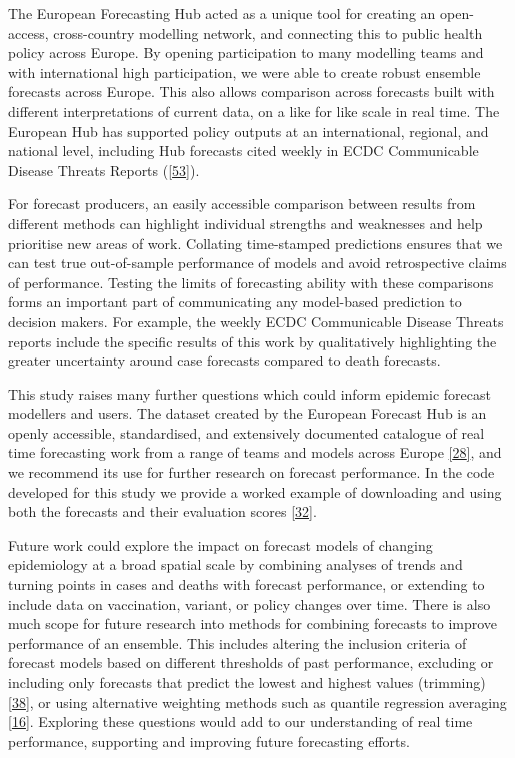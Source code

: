 \documentclass[
]{article}
\begin{document}
The European Forecasting Hub acted as a unique tool for creating an open-access, cross-country modelling network, and connecting this to public health policy across Europe. By opening participation to many modelling teams and with international high participation, we were able to create robust ensemble forecasts across Europe. This also allows comparison across forecasts built with different interpretations of current data, on a like for like scale in real time. The European Hub has supported policy outputs at an international, regional, and national level, including Hub forecasts cited weekly in ECDC Communicable Disease Threats Reports (\protect\hyperlink{ref-europeancentrefordiseasepreventionandcontrolWeeklyThreatsReports}{{[}53{]}}).

For forecast producers, an easily accessible comparison between results from different methods can highlight individual strengths and weaknesses and help prioritise new areas of work. Collating time-stamped predictions ensures that we can test true out-of-sample performance of models and avoid retrospective claims of performance. Testing the limits of forecasting ability with these comparisons forms an important part of communicating any model-based prediction to decision makers. For example, the weekly ECDC Communicable Disease Threats reports include the specific results of this work by qualitatively highlighting the greater uncertainty around case forecasts compared to death forecasts.

This study raises many further questions which could inform epidemic forecast modellers and users. The dataset created by the European Forecast Hub is an openly accessible, standardised, and extensively documented catalogue of real time forecasting work from a range of teams and models across Europe \protect\hyperlink{ref-europeancovid-19forecasthubEuropeanCovid19Forecast}{{[}28{]}}, and we recommend its use for further research on forecast performance. In the code developed for this study we provide a worked example of downloading and using both the forecasts and their evaluation scores \protect\hyperlink{ref-PredictivePerformanceMultimodel2022}{{[}32{]}}.

Future work could explore the impact on forecast models of changing epidemiology at a broad spatial scale by combining analyses of trends and turning points in cases and deaths with forecast performance, or extending to include data on vaccination, variant, or policy changes over time. There is also much scope for future research into methods for combining forecasts to improve performance of an ensemble. This includes altering the inclusion criteria of forecast models based on different thresholds of past performance, excluding or including only forecasts that predict the lowest and highest values (trimming) \protect\hyperlink{ref-taylorCombiningProbabilisticForecasts2021}{{[}38{]}}, or using alternative weighting methods such as quantile regression averaging \protect\hyperlink{ref-funkShorttermForecastsInform2020}{{[}16{]}}. Exploring these questions would add to our understanding of real time performance, supporting and improving future forecasting efforts.
\end{document}
